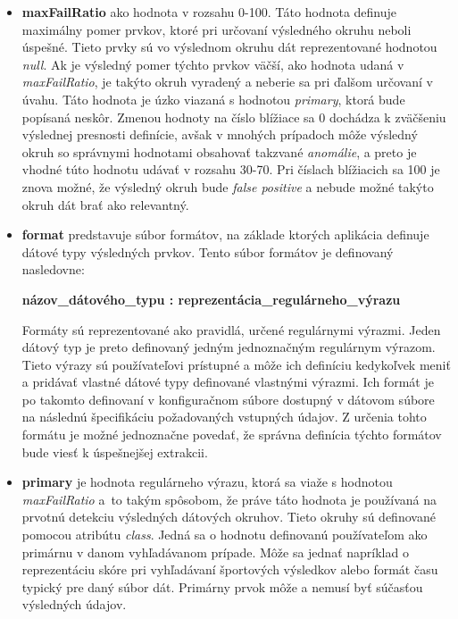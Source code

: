 \begin{itemize}
  \item \textbf{maxFailRatio} ako hodnota v rozsahu 0-100. Táto hodnota definuje maximálny pomer prvkov, ktoré pri určovaní výsledného okruhu neboli úspešné. Tieto prvky sú vo výslednom okruhu dát reprezentované hodnotou \textit{null}. Ak je výsledný pomer týchto prvkov väčší, ako hodnota udaná v \textit{maxFailRatio}, je takýto okruh vyradený a neberie sa pri ďalšom určovaní v úvahu. Táto hodnota je úzko viazaná s hodnotou \textit{primary}, ktorá bude popísaná neskôr. Zmenou hodnoty na číslo blížiace sa 0 dochádza k zväčšeniu výslednej presnosti definície, avšak v mnohých prípadoch môže výsledný okruh so správnymi hodnotami obsahovať takzvané \textit{anomálie}, a preto je vhodné túto hodnotu udávať v rozsahu 30-70. Pri číslach blížiacich sa 100 je znova možné, že výsledný okruh bude \textit{false positive} a nebude možné takýto okruh dát brať ako relevantný.
  \item \textbf{format} predstavuje súbor formátov, na základe ktorých aplikácia definuje dátové typy výsledných prvkov. Tento súbor formátov je definovaný nasledovne:
  
  \textbf{názov\_dátového\_typu : reprezentácia\_regulárneho\_výrazu}
  
  Formáty sú reprezentované ako pravidlá, určené regulárnymi výrazmi. Jeden  dátový typ je preto definovaný jedným jednoznačným regulárnym výrazom. Tieto výrazy sú používateľovi prístupné a môže ich definíciu kedykoľvek meniť a pridávať vlastné dátové typy definované vlastnými výrazmi. Ich formát je po takomto definovaní v konfiguračnom súbore dostupný v dátovom súbore na následnú špecifikáciu požadovaných vstupných údajov. Z určenia tohto formátu je možné jednoznačne povedať, že správna definícia týchto formátov bude viesť k úspešnejšej extrakcii. 
  
  \item \textbf{primary} je hodnota regulárneho výrazu, ktorá sa viaže s hodnotou \textit{maxFailRatio} a~to takým spôsobom, že práve táto hodnota je používaná na prvotnú detekciu výsledných dátových okruhov. Tieto okruhy sú definované pomocou atribútu \textit{class}. Jedná sa o hodnotu definovanú používateľom ako primárnu v danom vyhľadávanom prípade. Môže sa jednať napríklad o reprezentáciu skóre pri vyhľadávaní športových výsledkov alebo formát času typický pre daný súbor dát. Primárny prvok môže a nemusí byť súčasťou výsledných údajov.
\end{itemize}

